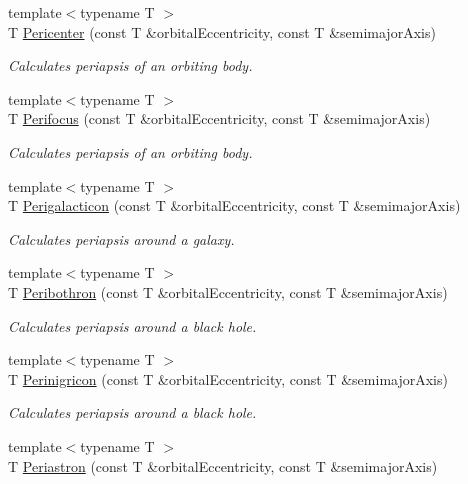 \begin{DoxyCompactItemize}
{\footnotesize template$<$typename T $>$ }\\T \mbox{\hyperlink{group___e_g_x_phys-_periapsis_gac4c419a87a5802cf6afc98f50792e99f}{Pericenter}} (const T \&orbital\+Eccentricity, const T \&semimajor\+Axis)
\begin{DoxyCompactList}\small\item\em Calculates periapsis of an orbiting body. \end{DoxyCompactList}\item 
{\footnotesize template$<$typename T $>$ }\\T \mbox{\hyperlink{group___e_g_x_phys-_periapsis_gaff62669fb364a245cb85f9a91d8ea71f}{Perifocus}} (const T \&orbital\+Eccentricity, const T \&semimajor\+Axis)
\begin{DoxyCompactList}\small\item\em Calculates periapsis of an orbiting body. \end{DoxyCompactList}\item 
{\footnotesize template$<$typename T $>$ }\\T \mbox{\hyperlink{group___e_g_x_phys-_periapsis_ga074fecab96b90bebffa512a37e52d90b}{Perigalacticon}} (const T \&orbital\+Eccentricity, const T \&semimajor\+Axis)
\begin{DoxyCompactList}\small\item\em Calculates periapsis around a galaxy. \end{DoxyCompactList}\item 
{\footnotesize template$<$typename T $>$ }\\T \mbox{\hyperlink{group___e_g_x_phys-_periapsis_gada5892309279a3a687c4eb2f88238e4e}{Peribothron}} (const T \&orbital\+Eccentricity, const T \&semimajor\+Axis)
\begin{DoxyCompactList}\small\item\em Calculates periapsis around a black hole. \end{DoxyCompactList}\item 
{\footnotesize template$<$typename T $>$ }\\T \mbox{\hyperlink{group___e_g_x_phys-_periapsis_ga99d86af90179994e17158b082c502fd4}{Perinigricon}} (const T \&orbital\+Eccentricity, const T \&semimajor\+Axis)
\begin{DoxyCompactList}\small\item\em Calculates periapsis around a black hole. \end{DoxyCompactList}\item 
{\footnotesize template$<$typename T $>$ }\\T \mbox{\hyperlink{group___e_g_x_phys-_periapsis_ga477de6824cbb5986cdae923141e21648}{Periastron}} (const T \&orbital\+Eccentricity, const T \&semimajor\+Axis)

\end{DoxyCompactItemize}
